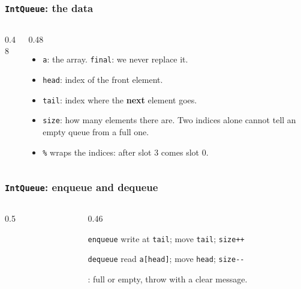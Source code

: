 \documentclass[aspectratio=169,10pt,compress]{beamer}
\begin{document}
\begin{frame}[t,fragile] \frametitle{\texttt{IntQueue}: the data}
  \begin{columns}[T]
    \begin{column}{0.48\textwidth}
    \end{column}
    \begin{column}{0.48\textwidth}
      \begin{itemize}\small
        \item \texttt{a}: the array. \texttt{final}: we never replace it.
        \item \texttt{head}: index of the front element.
        \item \texttt{tail}: index where the \textbf{next} element goes.
        \item \texttt{size}: how many elements there are. Two indices alone cannot tell an empty queue from a full one.
        \item \texttt{\%} wraps the indices: after slot 3 comes slot 0.
      \end{itemize}
    \end{column}
  \end{columns}
\end{frame}




\begin{frame}[t,fragile] \frametitle{\texttt{IntQueue}: enqueue and dequeue}
  \begin{columns}[T]
    \begin{column}{0.5\textwidth}
    \end{column}
    \begin{column}{0.46\textwidth}
      \begin{block}{\texttt{enqueue}}
        \small write at \texttt{tail}; move \texttt{tail}; \texttt{size++}
      \end{block}
      \begin{block}{\texttt{dequeue}}
        \small read \texttt{a[head]}; move \texttt{head}; \texttt{size-{}-}
      \end{block}
      \small {}: full or empty, throw with a clear message.
    \end{column}
  \end{columns}
\end{frame}
\end{document}

